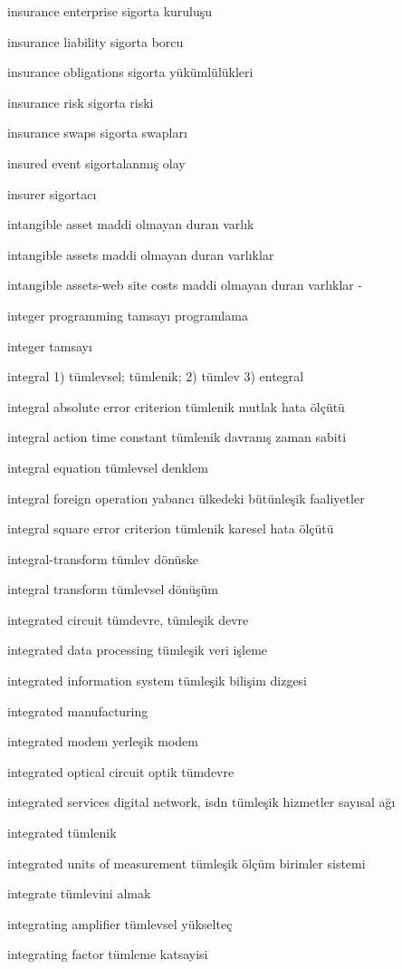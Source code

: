 \documentclass[12pt,fleqn]{article}\usepackage{../../common}
\begin{document}
insurance enterprise sigorta kuruluşu

insurance liability sigorta borcu

insurance obligations sigorta yükümlülükleri

insurance risk sigorta riski

insurance swaps sigorta swapları

insured event sigortalanmış olay

insurer sigortacı

intangible asset maddi olmayan duran varlık

intangible assets maddi olmayan duran varlıklar

intangible assets-web site costs maddi olmayan duran varlıklar -

integer programming tamsayı programlama

integer tamsayı

integral 1) tümlevsel; tümlenik; 2) tümlev 3) entegral

integral absolute error criterion tümlenik mutlak hata ölçütü

integral action time constant tümlenik davranış zaman sabiti

integral equation tümlevsel denklem

integral foreign operation yabancı ülkedeki bütünleşik faaliyetler

integral square error criterion tümlenik karesel hata ölçütü

integral-transform tümlev dönüske

integral transform tümlevsel dönüşüm

integrated circuit tümdevre, tümleşik devre

integrated data processing tümleşik veri işleme

integrated information system tümleşik bilişim dizgesi

integrated manufacturing

integrated modem yerleşik modem

integrated optical circuit optik tümdevre

integrated services digital network, isdn tümleşik hizmetler sayısal ağı

integrated tümlenik

integrated units of measurement tümleşik ölçüm birimler sistemi

integrate tümlevini almak

integrating amplifier tümlevsel yükselteç

integrating factor tümleme katsayisi
\end{document}
